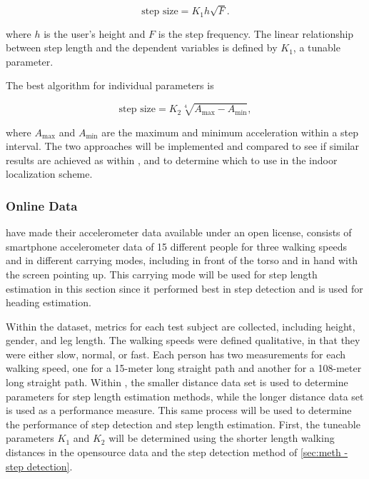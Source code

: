 \begin{equation}
	\label{eq:Tian2016_sle2}
	\text{step size} = K_1 h \sqrt{F}.
\end{equation}


where $h$ is the user's height and $F$ is the step frequency. The linear relationship between step length and the dependent variables is defined by $ K_1 $, a tunable parameter. \par 

The best algorithm for individual parameters is 

\begin{equation}
	\text{step size} =K_2 \sqrt[4]{A_{\max }-A_{\min }},
	\label{eq:weinberg_stepsize2}
\end{equation}

where $A_{\max}$ and $A_{\min}$ are the maximum and minimum acceleration within a step interval. The two approaches will be implemented and compared to see if similar results are achieved as within \cite{Vezocnik2019}, and to determine which to use in the indoor localization scheme.

\subsubsection{Online Data}

\citet{Vezocnik2019} have made their accelerometer data available under an open license, consists of smartphone accelerometer data of 15 different people for three walking speeds and in different carrying modes, including in front of the torso and in hand with the screen pointing up. This carrying mode will be used for step length estimation in this section since it performed best in step detection and is used for heading estimation. \par 
Within the dataset, metrics for each test subject are collected, including height, gender, and leg length. The walking speeds were defined qualitative, in that they were either slow, normal, or fast. Each person has two measurements for each walking speed, one for a 15-meter long straight path and another for a 108-meter long straight path. Within \cite{Vezocnik2019}, the smaller distance data set is used to determine parameters for step length estimation methods, while the longer distance data set is used as a performance measure. This same process will be used to determine the performance of step detection and step length estimation. First, the tuneable parameters $ K_1$ and $ K_2$ will be determined using the shorter length walking distances in the opensource data and the step detection method of \cref{sec:meth - step detection}. \par 

